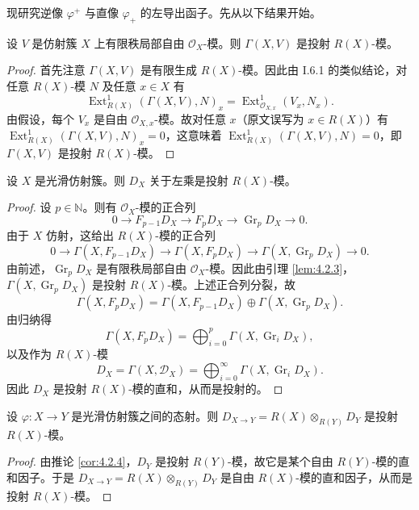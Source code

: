 现研究逆像 $\varphi^+$ 与直像 $\varphi_+$ 的左导出函子。先从以下结果开始。

\begin{lemma}\label{lem:4.2.3}
设 $V$ 是仿射簇 $X$ 上有限秩局部自由 $\mathcal{O}_X$-模。则 $\Gamma(X,V)$ 是投射 $R(X)$-模。
\end{lemma}

\begin{proof}
首先注意 $\Gamma(X,V)$ 是有限生成 $R(X)$-模。因此由 I.6.1 的类似结论，对任意 $R(X)$-模 $N$ 及任意 $x\in X$ 有
$$\operatorname{Ext}^1_{R(X)}(\Gamma(X,V),N)_x=\operatorname{Ext}^1_{\mathcal{O}_{X,x}}(V_x,N_x).$$
由假设，每个 $V_x$ 是自由 $\mathcal{O}_{X,x}$-模。故对任意 $x$（原文误写为 $x\in R(X)$）有
$\operatorname{Ext}^1_{R(X)}(\Gamma(X,V),N)_x=0$，这意味着
$\operatorname{Ext}^1_{R(X)}(\Gamma(X,V),N)=0$，即 $\Gamma(X,V)$ 是投射 $R(X)$-模。
\end{proof}

\begin{corollary}\label{cor:4.2.4}
设 $X$ 是光滑仿射簇。则 $D_X$ 关于左乘是投射 $R(X)$-模。
\end{corollary}

\begin{proof}
设 $p\in\mathbb{N}$。则有 $\mathcal{O}_X$-模的正合列
$$0\longrightarrow F_{p-1}D_X\longrightarrow F_pD_X\longrightarrow \operatorname{Gr}_pD_X\longrightarrow 0.$$
由于 $X$ 仿射，这给出 $R(X)$-模的正合列
$$0\longrightarrow\Gamma(X,F_{p-1}D_X)\longrightarrow\Gamma(X,F_pD_X)
\longrightarrow\Gamma(X,\operatorname{Gr}_pD_X)\longrightarrow 0.$$
由前述，$\operatorname{Gr}_pD_X$ 是有限秩局部自由 $\mathcal{O}_X$-模。因此由引理 \ref{lem:4.2.3}，$\Gamma(X,\operatorname{Gr}_pD_X)$ 是投射 $R(X)$-模。上述正合列分裂，故
$$\Gamma(X,F_pD_X)=\Gamma(X,F_{p-1}D_X)\oplus\Gamma(X,\operatorname{Gr}_pD_X).$$
由归纳得
$$\Gamma(X,F_pD_X)=\bigoplus_{i=0}^p\Gamma(X,\operatorname{Gr}_iD_X),$$
以及作为 $R(X)$-模
$$D_X=\Gamma(X,\mathcal{D}_X)=\bigoplus_{i=0}^{\infty}\Gamma(X,\operatorname{Gr}_iD_X).$$
因此 $D_X$ 是投射 $R(X)$-模的直和，从而是投射的。
\end{proof}

\begin{lemma}\label{lem:4.2.5}
设 $\varphi:X\to Y$ 是光滑仿射簇之间的态射。则
$D_{X\to Y}=R(X)\otimes_{R(Y)}D_Y$ 是投射 $R(X)$-模。
\end{lemma}

\begin{proof}
由推论 \ref{cor:4.2.4}，$D_Y$ 是投射 $R(Y)$-模，故它是某个自由 $R(Y)$-模的直和因子。于是
$D_{X\to Y}=R(X)\otimes_{R(Y)}D_Y$ 是自由 $R(X)$-模的直和因子，从而是投射 $R(X)$-模。
\end{proof}

